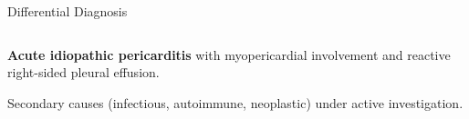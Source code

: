 \begin{frame}{Differential Diagnosis}
\begin{columns}[T]
    \begin{tcolorbox}[highlightbox,title={\faCheck\hspace{4pt}Working Diagnosis}]
      \small
      \textbf{Acute idiopathic pericarditis} with myopericardial involvement and reactive right-sided pleural effusion.
      \par\vspace{4pt}
      Secondary causes (infectious, autoimmune, neoplastic) under active investigation.
    \end{tcolorbox}
  \end{columns}
\end{frame}
